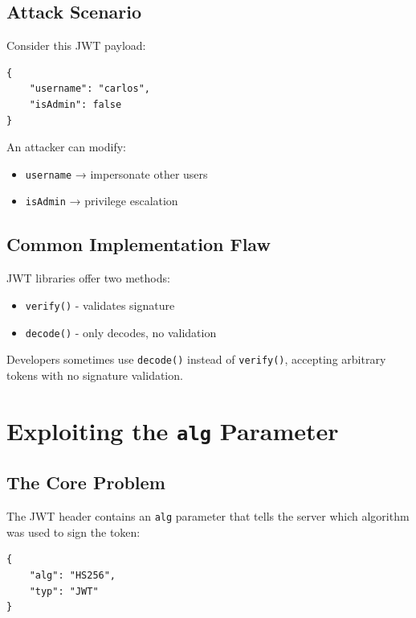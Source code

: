 \documentclass{article}
\begin{document}
\subsection{Attack Scenario}

Consider this JWT payload:
\begin{lstlisting}[caption=Vulnerable JWT Payload]
{
    "username": "carlos",
    "isAdmin": false
}
\end{lstlisting}

An attacker can modify:
\begin{itemize}
    \item \texttt{username} → impersonate other users
    \item \texttt{isAdmin} → privilege escalation
\end{itemize}

\subsection{Common Implementation Flaw}

JWT libraries offer two methods:
\begin{itemize}
    \item \texttt{verify()} - validates signature
    \item \texttt{decode()} - only decodes, no validation
\end{itemize}

\begin{attackbox}
Developers sometimes use \texttt{decode()} instead of \texttt{verify()}, 
accepting arbitrary tokens with no signature validation.
\end{attackbox}

\section{Exploiting the \texttt{alg} Parameter}

\subsection{The Core Problem}

The JWT header contains an \texttt{alg} parameter that tells the server which algorithm was used to sign the token:

\begin{lstlisting}[caption=JWT Header]
{
    "alg": "HS256",
    "typ": "JWT"
}
\end{lstlisting}
\end{document}
